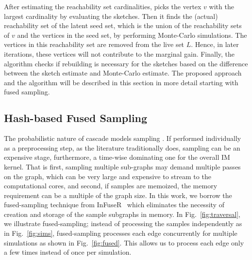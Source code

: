 After estimating the reachability set cardinalities, \acro picks the vertex $v$ with the largest cardinality by evaluating the sketches. Then it finds the (actual) reachability set of the latent seed set, which is the union of the reachability sets of $v$ and the vertices in the seed set, by performing Monte-Carlo simulations. The vertices in this reachability set are removed from the live set $L$. %
Hence, in later iterations, these vertices will not contribute to the marginal gain. Finally, the algorithm checks if rebuilding is necessary for the sketches based on the difference between the sketch estimate and Monte-Carlo estimate. The proposed approach and the algorithm will be described in this section in more detail starting with fused sampling.%

\subsection{Hash-based Fused Sampling}
The probabilistic nature of cascade models  sampling . If performed individually as a preprocessing step, as the literature traditionally does, sampling can be an expensive stage, furthermore, a time-wise dominating one for the overall IM kernel. That is first, sampling multiple sub-graphs may demand multiple passes on the graph, which can be very large and expensive to stream to the computational cores, and second, if samples are memoized, the memory requirement can be a multiple of the graph size. 
In this work, we borrow the fused-sampling technique from {\sc InFuseR}~\cite{infuser} which eliminates the necessity of creation and storage of the sample subgraphs in memory. 
In Fig.~\ref{fig:traversal}, we illustrate fused-sampling; instead of processing the samples independently as in Fig.~\ref{fig:sims}, fused-sampling processes each edge concurrently for multiple simulations as shown in Fig.~\ref{fig:fused}. This allows us to process each edge only a few times instead of once per simulation.


